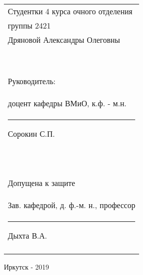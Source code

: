 \begin{titlepage}
\hfill \break
\hfill \break
\begin{flushright} %
\begin{tabular}{p{}} %


Студентки 4 курса очного отделения\\
группы 2421\\
Дряновой Александры Олеговны\\\

Руководитель:\\
доцент кафедры ВМиО, к.ф. - м.н.\\
\rule{3cm}{0.25pt}  Сорокин С.П.\\\

Допущена к защите\\
Зав. кафедрой, д. ф.-м. н., профессор\\
 \rule{3cm}{0.25pt}  Дыхта В.А.\\\\

\end{tabular}
\end{flushright}
\hfill \break
\begin{center} Иркутск - 2019 \end{center}
\thispagestyle{empty}
\end{titlepage}
